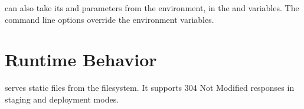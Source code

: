 \documentclass{manual}
\begin{document}
 can also take its  and  parameters from
the environment, in the  and 
variables. The command line options override the environment variables.


\section{Runtime Behavior}

 serves static files from the filesystem. It supports 304 Not
Modified responses in staging and deployment modes.




%
\end{document}
